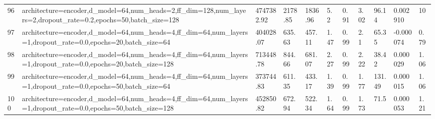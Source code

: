 \begin{longtable}{C{0.8cm} L{2cm} C{1.15cm} C{1.15cm} C{1.15cm} C{1.15cm} C{0.85cm} C{1.25cm} C{1.2cm} C{1.5cm} C{1.0cm}}
96 & architecture=encoder,\newline d\_model=64,\newline num\_heads=2,\newline ff\_dim=128,\newline num\_layers=2,\newline dropout\_rate=0.2,\newline epochs=50,\newline batch\_size=128 & 4747382.92 & 2178.85 & 1836.96 & 5.2 & 0.91 & 3.02 & 96.14 & 0.002910 & 10 \\
97 & architecture=encoder,\newline d\_model=64,\newline num\_heads=4,\newline ff\_dim=64,\newline num\_layers=1,\newline dropout\_rate=0.0,\newline epochs=20,\newline batch\_size=64 & 404028.07 & 635.63 & 457.11 & 1.47 & 0.99 & 2.1 & 65.35 & -0.000074 & 0.79 \\
98 & architecture=encoder,\newline d\_model=64,\newline num\_heads=4,\newline ff\_dim=64,\newline num\_layers=1,\newline dropout\_rate=0.0,\newline epochs=20,\newline batch\_size=128 & 713448.78 & 844.66 & 681.07 & 2.27 & 0.99 & 2.22 & 38.42 & 0.000029 & 1.06 \\
99 & architecture=encoder,\newline d\_model=64,\newline num\_heads=4,\newline ff\_dim=64,\newline num\_layers=1,\newline dropout\_rate=0.0,\newline epochs=50,\newline batch\_size=64 & 373744.83 & 611.35 & 433.17 & 1.39 & 0.99 & 1.77 & 131.49 & 0.000015 & 1.06 \\
100 & architecture=encoder,\newline d\_model=64,\newline num\_heads=4,\newline ff\_dim=64,\newline num\_layers=1,\newline dropout\_rate=0.0,\newline epochs=50,\newline batch\_size=128 & 452850.82 & 672.94 & 522.34 & 1.64 & 0.99 & 1.73 & 71.5 & 0.000053 & 1.21 \\

\end{longtable}
